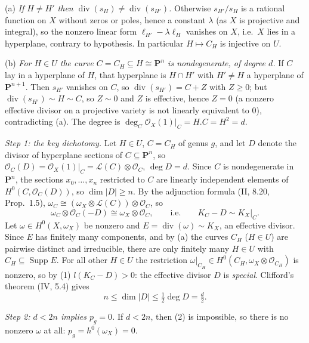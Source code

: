 \documentclass[11pt]{article}
\begin{document}
(a) \emph{If $H\ne H'$ then $\operatorname{div}(s_H)\ne\operatorname{div}(s_{H'})$.} Otherwise $s_{H'}/s_H$ is a rational function on $X$ without zeros or poles, hence a constant $\lambda$ (as $X$ is projective and integral), so the nonzero linear form $\ell_{H'}-\lambda\ell_H$ vanishes on $X$, i.e.\ $X$ lies in a hyperplane, contrary to hypothesis. In particular $H\mapsto C_H$ is injective on $U$.

(b) \emph{For $H\in U$ the curve $C=C_H\subseteq H\cong\mathbf P^n$ is nondegenerate, of degree $d$.} If $C$ lay in a hyperplane of $H$, that hyperplane is $H\cap H'$ with $H'\ne H$ a hyperplane of $\mathbf P^{n+1}$. Then $s_{H'}$ vanishes on $C$, so $\operatorname{div}(s_{H'})=C+Z$ with $Z\ge0$; but $\operatorname{div}(s_{H'})\sim H\sim C$, so $Z\sim0$ and $Z$ is effective, hence $Z=0$ (a nonzero effective divisor on a projective variety is not linearly equivalent to $0$), contradicting (a). The degree is $\deg_C\mathcal O_X(1)|_C=H.C=H^2=d$.

\emph{Step 1: the key dichotomy.} Let $H\in U$, $C=C_H$ of genus $g$, and let $D$ denote the divisor of hyperplane sections of $C\subseteq\mathbf P^n$, so $\mathcal O_C(D)=\mathcal O_X(1)|_C=\mathcal L(C)\otimes\mathcal O_C$, $\deg D=d$. Since $C$ is nondegenerate in $\mathbf P^n$, the sections $x_0,\dots,x_n$ restricted to $C$ are linearly independent elements of $H^0(C,\mathcal O_C(D))$, so $\dim|D|\ge n$. By the adjunction formula (II, 8.20, Prop.~1.5), $\omega_C\cong(\omega_X\otimes\mathcal L(C))\otimes\mathcal O_C$, so
\[
\omega_C\otimes\mathcal O_C(-D)\cong\omega_X\otimes\mathcal O_C,\qquad\text{i.e.}\qquad K_C-D\sim K_X|_C. \tag{1}
\]
Let $\omega\in H^0(X,\omega_X)$ be nonzero and $E=\operatorname{div}(\omega)\sim K_X$, an effective divisor. Since $E$ has finitely many components, and by (a) the curves $C_H$ ($H\in U$) are pairwise distinct and irreducible, there are only finitely many $H\in U$ with $C_H\subseteq\operatorname{Supp}E$. For all other $H\in U$ the restriction $\omega|_{C_H}\in H^0(C_H,\omega_X\otimes\mathcal O_{C_H})$ is nonzero, so by (1) $l(K_C-D)>0$: the effective divisor $D$ is \emph{special}. Clifford's theorem (IV, 5.4) gives
\[
n\le\dim|D|\le\tfrac12\deg D=\tfrac d2 . \tag{2}
\]

\emph{Step 2: $d<2n$ implies $p_g=0$.} If $d<2n$, then (2) is impossible, so there is no nonzero $\omega$ at all: $p_g=h^0(\omega_X)=0$.
\end{document}
